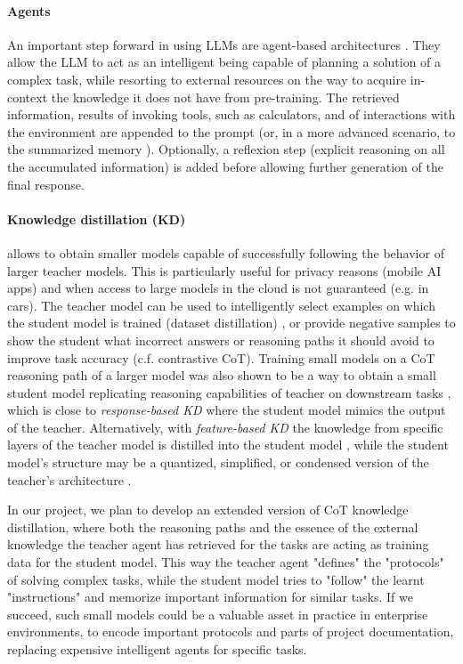 \documentclass[10pt]{article}
\begin{document}
\paragraph{Agents} An important step forward in using LLMs are agent-based architectures \cite{lin2024swiftsage} \cite{ghafarollahi2024sciagents}. They allow the LLM to act as an intelligent being capable of planning a solution of a complex task, while resorting to external resources on the way to acquire in-context the knowledge it does not have from pre-training. The retrieved information, results of invoking tools, such as calculators, and of interactions with the environment are appended to the prompt (or, in a more advanced scenario, to the summarized memory \cite{ge2023context}). Optionally, a reflexion step (explicit reasoning on all the accumulated information) is added before allowing further generation of the final response. 

\paragraph{Knowledge distillation (KD)} allows to obtain smaller models capable of successfully following the behavior of larger teacher models. This is particularly useful for privacy reasons (mobile AI apps) and when access to large models in the cloud is not guaranteed (e.g. in cars). The teacher model can be used to intelligently select examples on which the student model is trained (dataset distillation) \cite{yu2023dataset}, or provide negative samples to show the student what incorrect answers or reasoning paths it should avoid to improve task accuracy \cite{li2024turning} (c.f. contrastive CoT). Training small models on a CoT reasoning path of a larger model was also shown to be a way to obtain a small student model replicating reasoning capabilities of teacher on downstream tasks \cite{magister2022teaching}, which is close to \textit{response-based KD} where the student model mimics the output of the teacher. Alternatively, with \textit{feature-based KD} the knowledge from specific layers of the teacher model is distilled into the student model \cite{sepahvand2022teacher}, while the student model's structure may be a quantized, simplified, or condensed version of the teacher's architecture \cite{gou2021knowledge}. 

In our project, we plan to develop an extended version of CoT knowledge distillation, where both the reasoning paths and the essence of the external knowledge the teacher agent has retrieved for the tasks are acting as training data for the student model. This way the teacher agent "defines" the "protocols" of solving complex tasks, while the student model tries to "follow" the learnt "instructions" and memorize important information for similar tasks. If we succeed, such small models could be a valuable asset in practice in enterprise environments, to encode important protocols and parts of project documentation, replacing expensive intelligent agents for specific tasks. 
\end{document}
